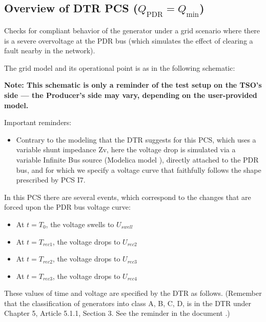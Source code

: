    \subsection{Overview of DTR PCS \DTRPcs{} ($Q_\text{PDR} = Q_\text{min}$)}

    Checks for compliant behavior of the generator under a grid scenario where
    there is a severe overvoltage at the PDR bus (which simulates the
    effect of clearing a fault nearby in the network).

    The grid model and its operational point is as in the following schematic:
    \begin{center}
        
    \end{center}
    \begin{center}
        \small \textbf{Note: This schematic is only a reminder of the test setup on the TSO's
        side --- the Producer's side may vary, depending on the user-provided model.}
    \end{center}

    \noindent Important reminders:
    \begin{itemize}
        \item Contrary to the modeling that the DTR suggests for this PCS, which uses a
        variable shunt impedance Zv, here the voltage drop is simulated via a variable
        Infinite Bus source (Modelica model ), directly
        attached to the PDR bus, and for which we specify a voltage curve that
        faithfully follows the shape prescribed by PCS I7.
    \end{itemize}

    In this PCS there are several events, which correspond to the changes that are
    forced upon the PDR bus voltage curve:
    \begin{itemize}
        \item At $t = T_{0}$, the voltage swells to $U_{swell}$
        \item At $t = T_{rec1}$, the voltage drops to $U_{rec2}$
        \item At $t = T_{rec2}$, the voltage drops to $U_{rec3}$
        \item At $t = T_{rec3}$, the voltage drops to $U_{rec4}$
    \end{itemize}
    These values of time and voltage are specified by the DTR as follows. (Remember
    that the classification of generators into class A, B, C, D, is in the DTR under
    Chapter 5, Article 5.1.1, Section 3. See the reminder in the document
    .)

